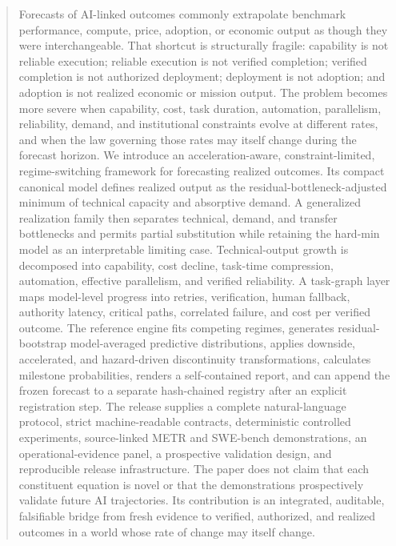 \begin{abstract}
Forecasts of AI-linked outcomes commonly extrapolate benchmark performance, compute, price, adoption, or economic output as though they were interchangeable. That shortcut is structurally fragile: capability is not reliable execution; reliable execution is not verified completion; verified completion is not authorized deployment; deployment is not adoption; and adoption is not realized economic or mission output. The problem becomes more severe when capability, cost, task duration, automation, parallelism, reliability, demand, and institutional constraints evolve at different rates, and when the law governing those rates may itself change during the forecast horizon. We introduce an acceleration-aware, constraint-limited, regime-switching framework for forecasting realized outcomes. Its compact canonical model defines realized output as the residual-bottleneck-adjusted minimum of technical capacity and absorptive demand. A generalized realization family then separates technical, demand, and transfer bottlenecks and permits partial substitution while retaining the hard-min model as an interpretable limiting case. Technical-output growth is decomposed into capability, cost decline, task-time compression, automation, effective parallelism, and verified reliability. A task-graph layer maps model-level progress into retries, verification, human fallback, authority latency, critical paths, correlated failure, and cost per verified outcome. The reference engine fits competing regimes, generates residual-bootstrap model-averaged predictive distributions, applies downside, accelerated, and hazard-driven discontinuity transformations, calculates milestone probabilities, renders a self-contained report, and can append the frozen forecast to a separate hash-chained registry after an explicit registration step. The release supplies a complete natural-language protocol, strict machine-readable contracts, deterministic controlled experiments, source-linked METR and SWE-bench demonstrations, an operational-evidence panel, a prospective validation design, and reproducible release infrastructure. The paper does not claim that each constituent equation is novel or that the demonstrations prospectively validate future AI trajectories. Its contribution is an integrated, auditable, falsifiable bridge from fresh evidence to verified, authorized, and realized outcomes in a world whose rate of change may itself change.
\end{abstract}

